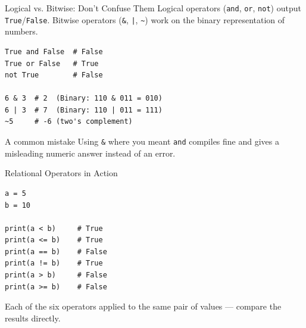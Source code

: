 \documentclass[9pt,aspectratio=169,xcolor=table]{beamer}
\begin{document}
\begin{frame}[fragile]{Logical vs. Bitwise: Don't Confuse Them}
    \leavevmode
    \alert{Logical} operators (\texttt{and}, \texttt{or}, \texttt{not})
    output \texttt{True}/\texttt{False}. \alert{Bitwise} operators
    (\texttt{\&}, \texttt{|}, \texttt{\textasciitilde}) work on the
    binary representation of numbers.

\begin{lstlisting}
True and False  # False
True or False   # True
not True        # False

6 & 3  # 2  (Binary: 110 & 011 = 010)
6 | 3  # 7  (Binary: 110 | 011 = 111)
~5     # -6 (two's complement)
\end{lstlisting}

    \vspace{1mm}
    \begin{alertblock}{A common mistake}
        Using \texttt{\&} where you meant \texttt{and} compiles fine and
        gives a misleading numeric answer instead of an error.
    \end{alertblock}
\end{frame}

\begin{frame}[fragile]{Relational Operators in Action}
    \leavevmode
\begin{lstlisting}
a = 5
b = 10

print(a < b)     # True
print(a <= b)    # True
print(a == b)    # False
print(a != b)    # True
print(a > b)     # False
print(a >= b)    # False
\end{lstlisting}

    \vspace{1mm}
    {\small Each of the six operators applied to the same pair of values
    --- compare the results directly.}
\end{frame}
\end{document}
